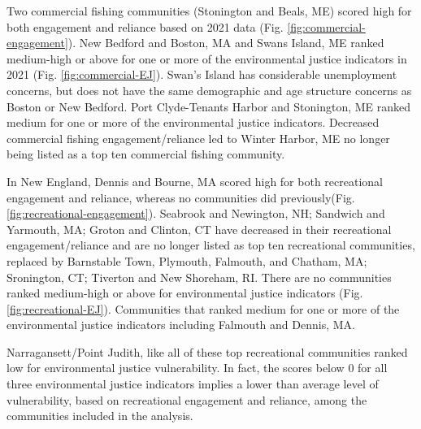 \documentclass[
  10pt,
]{article}
\begin{document}
Two commercial fishing communities (Stonington and Beals, ME) scored high for both engagement and reliance based on 2021 data (Fig. \ref{fig:commercial-engagement}). New Bedford and Boston, MA and Swans Island, ME ranked medium-high or above for one or more of the environmental justice indicators in 2021 (Fig. \ref{fig:commercial-EJ}). Swan's Island has considerable unemployment concerns, but does not have the same demographic and age structure concerns as Boston or New Bedford. Port Clyde-Tenants Harbor and Stonington, ME ranked medium for one or more of the environmental justice indicators. Decreased commercial fishing engagement/reliance led to Winter Harbor, ME no longer being listed as a top ten commercial fishing community.

In New England, Dennis and Bourne, MA scored high for both recreational engagement and reliance, whereas no communities did previously(Fig.\ref{fig:recreational-engagement}). Seabrook and Newington, NH; Sandwich and Yarmouth, MA; Groton and Clinton, CT have decreased in their recreational engagement/reliance and are no longer listed as top ten recreational communities, replaced by Barnstable Town, Plymouth, Falmouth, and Chatham, MA; Sronington, CT; Tiverton and New Shoreham, RI. There are no communities ranked medium-high or above for environmental justice indicators (Fig. \ref{fig:recreational-EJ}). Communities that ranked medium for one or more of the environmental justice indicators including Falmouth and Dennis, MA.

Narragansett/Point Judith, like all of these top recreational communities ranked low for environmental justice vulnerability. In fact, the scores below 0 for all three environmental justice indicators implies a lower than average level of vulnerability, based on recreational engagement and reliance, among the communities included in the analysis.
\end{document}
